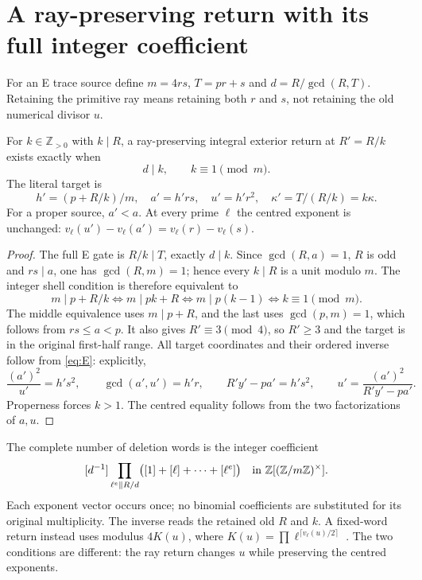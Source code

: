 \section{A ray-preserving return with its full integer coefficient}\label{sec:ray}
For an E trace source define $m=4rs$, $T=pr+s$ and
$d=R/\gcd(R,T)$. Retaining the primitive ray means retaining both $r$ and $s$,
not retaining the old numerical divisor $u$.

\begin{theorem}\label{thm:ray}
For \(k\in\mathbb Z_{>0}\) with $k\mid R$, a ray-preserving integral exterior
return at $R'=R/k$ exists
exactly when
\begin{equation}\label{eq:delete}
 d\mid k,\qquad k\equiv1\pmod m.
\end{equation}
The literal target is
\[
 h'=(p+R/k)/m,\quad a'=h'rs,\quad u'=h'r^2,\quad
 \kappa'=T/(R/k)=k\kappa.
\]
For a proper source, $a'<a$. At every prime $\ell$ the centred exponent is
unchanged: $v_\ell(u')-v_\ell(a')=v_\ell(r)-v_\ell(s)$.
\end{theorem}
\begin{proof}
The full E gate is $R/k\mid T$, exactly $d\mid k$. Since
\(\gcd(R,a)=1\), \(R\) is odd and \(rs\mid a\), one has
\(\gcd(R,m)=1\); hence every \(k\mid R\) is a unit modulo \(m\).
The integer shell condition is therefore equivalent to
\[
 m\mid p+R/k
 \Longleftrightarrow m\mid pk+R
 \Longleftrightarrow m\mid p(k-1)
 \Longleftrightarrow k\equiv1\pmod m.
\]
The middle equivalence uses \(m\mid p+R\), and the last uses
\(\gcd(p,m)=1\), which follows from \(rs\le a<p\). It also gives
$R'\equiv3\pmod4$,
so $R'\ge3$ and the target is in the original first-half range. All target
coordinates and their ordered inverse follow from \eqref{eq:E}: explicitly,
\[
 \frac{(a')^2}{u'}=h's^2,\qquad
 \gcd(a',u')=h'r,\qquad
 R'y'-pa'=h's^2,\qquad
 u'=\frac{(a')^2}{R'y'-pa'}.
\]
Properness
forces $k>1$. The centred equality follows from the two factorizations of $a,u$.
\end{proof}

The complete number of deletion words is the integer coefficient
\begin{equation}\label{eq:coefficient}
 [d^{-1}]\prod_{\ell^e\parallel R/d}
 \bigl([1]+[\ell]+\cdots+[\ell^e]\bigr)
 \quad\hbox{in }\mathbb Z[(\mathbb Z/m\mathbb Z)^\times].
\end{equation}
Each exponent vector occurs once; no binomial coefficients are substituted
for its original multiplicity. The inverse reads the retained old $R$ and $k$.
A fixed-word return instead uses modulus $4K(u)$, where
$K(u)=\prod\ell^{\lceil v_\ell(u)/2\rceil}$ \cite{Word}. The two conditions
are different: the ray return changes $u$ while preserving the centred exponents.

